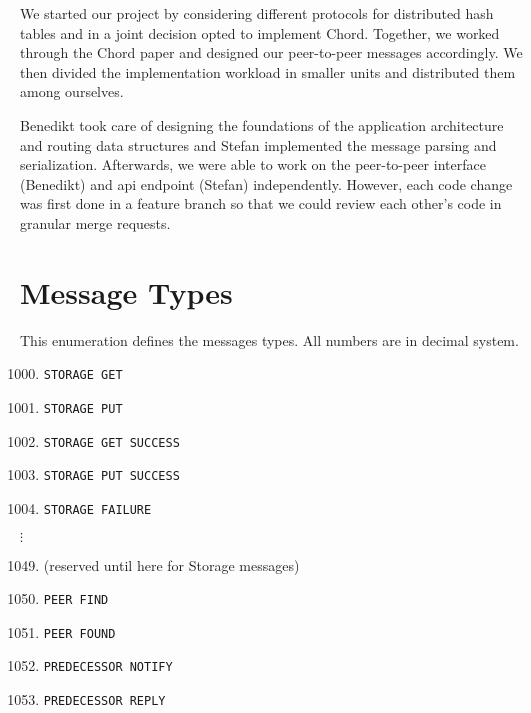 \documentclass[a4paper, 11pt]{article}
\begin{document}
    We started our project by considering different protocols for distributed hash tables and in a joint decision opted to implement Chord. Together, we worked through the Chord paper \cite{Chord} and designed our peer-to-peer messages accordingly. We then divided the implementation workload in smaller units and distributed them among ourselves.
    
    Benedikt took care of designing the foundations of the application architecture and routing data structures and Stefan implemented the message parsing and serialization. Afterwards, we were able to work on the peer-to-peer interface (Benedikt) and api endpoint (Stefan) independently. However, each code change was first done in a feature branch so that we could review each other's code in granular merge requests.
    
    \pagebreak
    
    
    
    
    \pagebreak
    
    \renewcommand\thesection{\Alph{section}}
    \setcounter{section}{0}
    \section{Message Types}
    \label{appendix:message-types}
    
    This enumeration defines the messages types. All numbers are in decimal system.
    
    \begin{enumerate}
        \setcounter{enumi}{999}
        \item \texttt{STORAGE GET}
        \item \texttt{STORAGE PUT}
        \item \texttt{STORAGE GET SUCCESS}
        \item \texttt{STORAGE PUT SUCCESS}
        \item \texttt{STORAGE FAILURE}
    \end{enumerate}
    
    $\vdots$
    
    \begin{enumerate}
        \setcounter{enumi}{1048}
        \item (reserved until here for Storage messages)
        \item \texttt{PEER FIND}
        \item \texttt{PEER FOUND}
        \item \texttt{PREDECESSOR NOTIFY}
        \item \texttt{PREDECESSOR REPLY}
    \end{enumerate}
    
\end{document}
